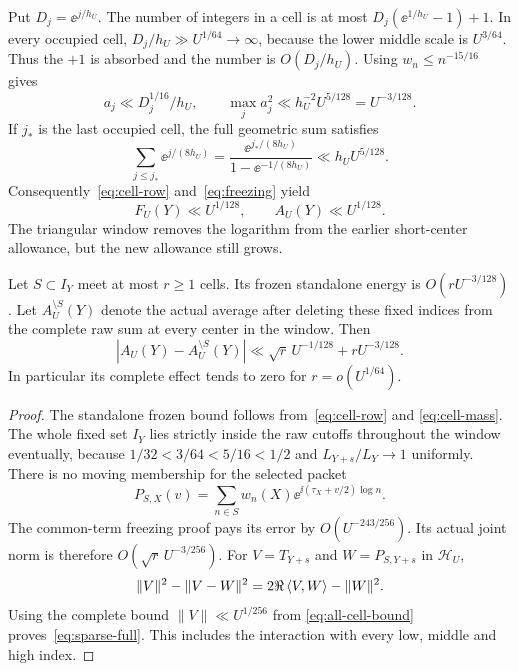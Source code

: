Put $D_j=\ee^{j/h_U}$. The number of integers in a cell is at most
$D_j(\ee^{1/h_U}-1)+1$. In every occupied cell,
$D_j/h_U\gg U^{1/64}\to\infty$, because the lower middle scale is
$U^{3/64}$. Thus the $+1$ is absorbed and the number is $O(D_j/h_U)$.
Using $w_n\le n^{-15/16}$ gives
\begin{equation}\label{eq:cell-mass}
 a_j\ll D_j^{1/16}/h_U,\qquad
 \max_ja_j^2\ll h_U^{-2}U^{5/128}=U^{-3/128}.
\end{equation}
If $j_*$ is the last occupied cell, the full geometric sum satisfies
\[
 \sum_{j\le j_*}\ee^{j/(8h_U)}
 =\frac{\ee^{j_*/(8h_U)}}{1-\ee^{-1/(8h_U)}}
 \ll h_U U^{5/128}.
\]
Consequently~\eqref{eq:cell-row} and~\eqref{eq:freezing} yield
\begin{equation}\label{eq:all-cell-bound}
 F_U(Y)\ll U^{1/128},\qquad A_U(Y)\ll U^{1/128}.
\end{equation}
The triangular window removes the logarithm from the earlier
short-center allowance, but the new allowance still grows.

\begin{theorem}\label{thm:sparse}
Let $S\subset I_Y$ meet at most $r\ge1$ cells.
Its frozen standalone energy is $O(rU^{-3/128})$.
Let $A_U^{\setminus S}(Y)$ denote the actual average after deleting
these fixed indices from the complete raw sum at every center in the
window. Then
\begin{equation}\label{eq:sparse-full}
 |A_U(Y)-A_U^{\setminus S}(Y)|
 \ll\sqrt r\,U^{-1/128}+rU^{-3/128}.
\end{equation}
In particular its complete effect tends to zero for $r=o(U^{1/64})$.
\end{theorem}

\begin{proof}
The standalone frozen bound follows from~\eqref{eq:cell-row} and
\eqref{eq:cell-mass}. The whole fixed set $I_Y$ lies strictly inside
the raw cutoffs throughout the window eventually, because
$1/32<3/64<5/16<1/2$ and $L_{Y+s}/L_Y\to1$ uniformly.
There is no moving membership for the selected packet
\[
 P_{S,X}(v)=\sum_{n\in S}w_n(X)\ee^{\ii(\tau_X+v/2)\log n}.
\]
The common-term freezing proof pays its error by $O(U^{-243/256})$.
Its actual joint norm is therefore $O(\sqrt r\,U^{-3/256})$.
For $V=T_{Y+s}$ and $W=P_{S,Y+s}$ in $\mathcal H_U$,
\[
 \|V\|^2-\|V-W\|^2=2\Re\left\langle V,W\right\rangle-\|W\|^2.
\]
Using the complete bound $\|V\|\ll U^{1/256}$ from
\eqref{eq:all-cell-bound} proves~\eqref{eq:sparse-full}.
This includes the interaction with every low, middle and high index.
\end{proof}

